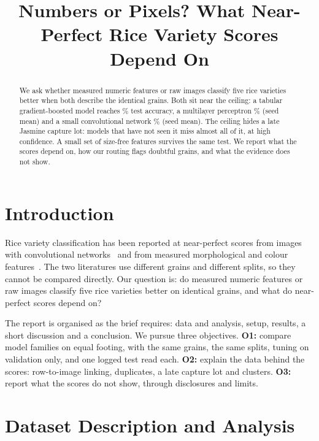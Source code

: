 \documentclass[conference,a4paper]{IEEEtran}
\begin{document}
\title{Numbers or Pixels? What Near-Perfect Rice Variety Scores Depend On}
\author{
}
\maketitle

\begin{abstract}
We ask whether measured numeric features or raw images classify five rice varieties better when both describe the identical grains. Both sit near the ceiling: a tabular gradient-boosted model reaches \TestAccHgbAllOneZeroSixPct\% test accuracy, a multilayer perceptron \TestAccMlpAllOneZeroSixSeedMeanPct\% (seed mean) and a small convolutional network \TestAccCnnImageSeedMeanPct\% (seed mean). The ceiling hides a late Jasmine capture lot: models that have not seen it miss almost all of it, at high confidence. A small set of size-free features survives the same test. We report what the scores depend on, how our routing flags doubtful grains, and what the evidence does not show.
\end{abstract}

\section{Introduction}
Rice variety classification has been reported at near-perfect scores from images with convolutional networks~\cite{koklu2021deep} and from measured morphological and colour features~\cite{cinar2021features,cinar2022ml,cinar2019ai}. The two literatures use different grains and different splits, so they cannot be compared directly. Our question is: do measured numeric features or raw images classify five rice varieties better on identical grains, and what do near-perfect scores depend on?

The report is organised as the brief requires: data and analysis, setup, results, a short discussion and a conclusion. We pursue three objectives. \textbf{O1:} compare model families on equal footing, with the same grains, the same splits, tuning on validation only, and one logged test read each. \textbf{O2:} explain the data behind the scores: row-to-image linking, duplicates, a late capture lot and clusters. \textbf{O3:} report what the scores do not show, through disclosures and limits.

\section{Dataset Description and Analysis}
\end{document}

